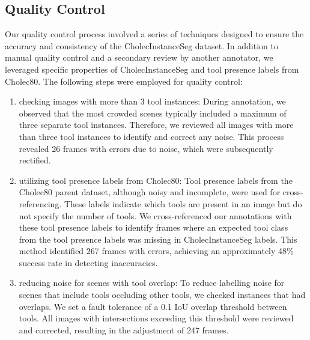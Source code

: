 \subsection{Quality Control}\hypertarget{sec:quality_control}{}
Our quality control process involved a series of techniques designed to ensure the accuracy and consistency of the CholecInstanceSeg dataset. In addition to manual quality control and a secondary review by another annotator, we leveraged specific properties of CholecInstanceSeg and tool presence labels from Cholec80. The following steps were employed for quality control:
\begin{enumerate}
    \item checking images with more than 3 tool instances: During annotation, we observed that the most crowded scenes typically included a maximum of three separate tool instances. Therefore, we reviewed all images with more than three tool instances to identify and correct any noise. This process revealed 26 frames with errors due to noise, which were subsequently rectified.
    \item utilizing tool presence labels from Cholec80: Tool presence labels from the Cholec80 parent dataset, although noisy and incomplete, were used for cross-referencing. These labels indicate which tools are present in an image but do not specify the number of tools.
    We cross-referenced our annotations with these tool presence labels to identify frames where an expected tool class from the tool presence labels was missing in CholecInstanceSeg labels. 
    This method identified 267 frames with errors, achieving an approximately 48\% success rate in detecting inaccuracies.   
    \item reducing noise for scenes with tool overlap:  To reduce labelling noise for scenes that include tools occluding other tools, we checked instances that had overlaps. We set a fault tolerance of a 0.1 IoU overlap threshold between tools. All images with intersections exceeding this threshold were reviewed and corrected, resulting in the adjustment of 247 frames. 
\end{enumerate}    
